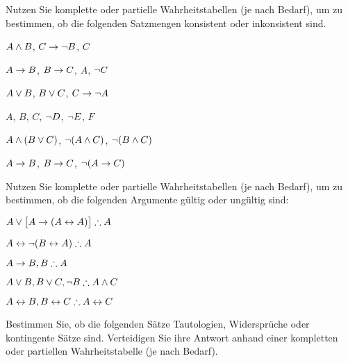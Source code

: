 \problempart
\label{pr.TT.satisfiable4}
Nutzen Sie komplette oder partielle Wahrheitstabellen (je nach Bedarf), um zu bestimmen, ob die folgenden Satzmengen konsistent oder inkonsistent sind.
\begin{earg}
\item $A \wedge B$, $C\rightarrow \neg B$, $C$ %
\item $A\rightarrow B$, $B\rightarrow C$, $A$, $\neg C$ %
\item $A \vee B$, $B\vee C$, $C\rightarrow \neg A$ %
\item $A$, $B$, $C$, $\neg D$, $\neg E$, $F$ %
\item $A \wedge (B \vee C)$, $\neg(A \wedge C)$, $\neg(B \wedge C)$ %
\item $A \rightarrow B$, $B \rightarrow C$, $\neg(A \rightarrow C)$ %
\end{earg}

\problempart
\label{pr.TT.valid4}
Nutzen Sie komplette oder partielle Wahrheitstabellen (je nach Bedarf), um zu bestimmen, ob die folgenden Argumente gültig oder ungültig sind:
\begin{earg}
\item $A\eor\bigl[A\eif(A\eiff A)\bigr] \therefore A$ %
\item $A\eiff\enot(B\eiff A) \therefore A$ %
\item $A\eif B, B \therefore A$ %
\item $A\eor B, B\eor C, \enot B \therefore A \eand C$ %
\item $A\eiff B, B\eiff C \therefore A\eiff C$ %
\end{earg}

\problempart
\label{pr.TT.TTorC3}
Bestimmen Sie, ob die folgenden Sätze Tautologien, Widersprüche oder kontingente Sätze sind. Verteidigen Sie ihre Antwort anhand einer kompletten oder partiellen Wahrheitstabelle (je nach Bedarf).


